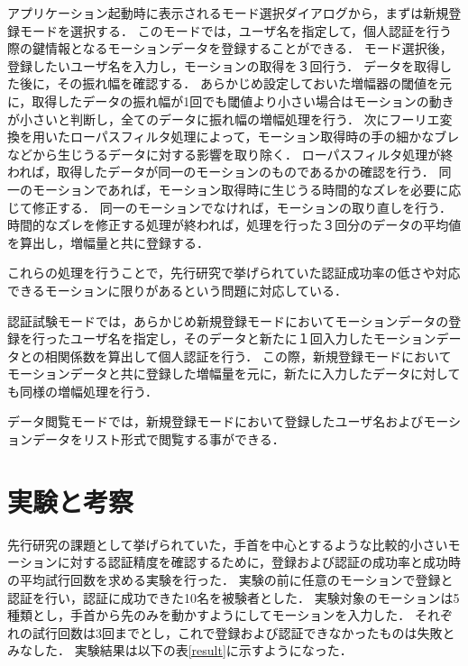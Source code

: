 \documentclass[11pt]{jarticle}
\begin{document}
アプリケーション起動時に表示されるモード選択ダイアログから，まずは新規登録モードを選択する．
このモードでは，ユーザ名を指定して，個人認証を行う際の鍵情報となるモーションデータを登録することができる．
モード選択後，登録したいユーザ名を入力し，モーションの取得を３回行う．
データを取得した後に，その振れ幅を確認する．
あらかじめ設定しておいた増幅器の閾値を元に，取得したデータの振れ幅が1回でも閾値より小さい場合はモーションの動きが小さいと判断し，全てのデータに振れ幅の増幅処理を行う．
次にフーリエ変換を用いたローパスフィルタ処理によって，モーション取得時の手の細かなブレなどから生じうるデータに対する影響を取り除く．
ローパスフィルタ処理が終われば，取得したデータが同一のモーションのものであるかの確認を行う．
同一のモーションであれば，モーション取得時に生じうる時間的なズレを必要に応じて修正する．
同一のモーションでなければ，モーションの取り直しを行う．
時間的なズレを修正する処理が終われば，処理を行った３回分のデータの平均値を算出し，増幅量と共に登録する．

これらの処理を行うことで，先行研究で挙げられていた認証成功率の低さや対応できるモーションに限りがあるという問題に対応している．

認証試験モードでは，あらかじめ新規登録モードにおいてモーションデータの登録を行ったユーザ名を指定し，そのデータと新たに１回入力したモーションデータとの相関係数を算出して個人認証を行う．
この際，新規登録モードにおいてモーションデータと共に登録した増幅量を元に，新たに入力したデータに対しても同様の増幅処理を行う．

データ閲覧モードでは，新規登録モードにおいて登録したユーザ名およびモーションデータをリスト形式で閲覧する事ができる．

\section{実験と考察}
先行研究の課題として挙げられていた，手首を中心とするような比較的小さいモーションに対する認証精度を確認するために，登録および認証の成功率と成功時の平均試行回数を求める実験を行った．
実験の前に任意のモーションで登録と認証を行い，認証に成功できた10名を被験者とした．
実験対象のモーションは5種類とし，手首から先のみを動かすようにしてモーションを入力した．
それぞれの試行回数は3回までとし，これで登録および認証できなかったものは失敗とみなした．
実験結果は以下の表\ref{result}に示すようになった．
\end{document}
